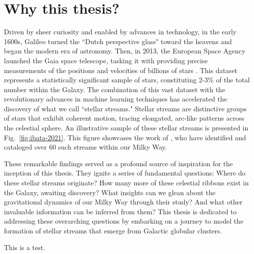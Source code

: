 \section{Why this thesis?}

Driven by sheer curiosity and enabled by advances in technology, in the early 1600s, Galileo turned the ``Dutch perspective glass" toward the heavens and began the modern era of astronomy. Then, in 2013, the European Space Agency launched the Gaia space telescope, tasking it with providing precise measurements of the positions and velocities of billions of stars \cite{2016A&A...595A...1G}. This dataset represents a statistically significant sample of stars, constituting 2-3\% of the total number within the Galaxy. The combination of this vast dataset with the revolutionary advances in machine learning techniques has accelerated the discovery of what we  call ``stellar streams." Stellar streams are distinctive groups of stars that exhibit coherent motion, tracing elongated, arc-like patterns across the celestial sphere. An illustrative sample of these stellar streams is presented in Fig.~\ref{fig:ibata-2021}. This figure showcases the work of \citet{2021ApJ...914..123I}, who have identified and cataloged over 60 such streams within our Milky Way.

These remarkable findings served as a profound source of inspiration for the inception of this thesis. They ignite a series of fundamental questions: Where do these stellar streams originate? How many more of these celestial ribbons exist in the Galaxy, awaiting discovery? What insights can we glean about the gravitational dynamics of our Milky Way through their study? And what other invaluable information can be inferred from them? This thesis is dedicated to addressing these overarching questions by embarking on a journey to model the formation of stellar streams that emerge from Galactic globular clusters.


This is a test. 


